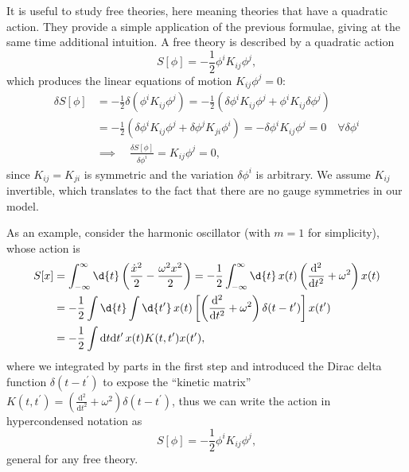 It is useful to study free theories, here meaning theories that have a quadratic action. They provide a simple application of the previous formulae, giving at the same time additional intuition. A free theory is described by a quadratic action
\[
    S[\phi] = - \frac{1}{2} \phi^i K_{ij} \phi^j,
\]
which produces the linear equations of motion \(K_{ij} \phi^j = 0\):
\[
    \begin{aligned}
        \delta S[\phi] & = - \frac{1}{2} \delta(\phi^i K_{ij} \phi^j) = - \frac{1}{2} \left( \delta \phi^i K_{ij} \phi^j + \phi^i K_{ij} \delta \phi^j \right)                    \\
                       & = - \frac{1}{2} \left( \delta \phi^i K_{ij} \phi^j + \delta \phi^j K_{ji} \phi^i \right) = - \delta \phi^i K_{ij} \phi^j = 0 \quad \forall \delta \phi^i \\
                       & \implies \quad \frac{\delta S[\phi]}{\delta \phi^i} = K_{ij} \phi^j = 0,
    \end{aligned}
\]
since \(K_{ij} = K_{ji}\) is symmetric and the variation \(\delta \phi^i\) is arbitrary. We assume \(K_{ij}\) invertible, which translates to the fact that there are no gauge symmetries in our model.

As an example, consider the harmonic oscillator (with \(m=1\) for simplicity), whose action is
\[
    \begin{aligned}
        S[x] & = \int_{-\infty}^{\infty}\d{t} \left(\frac{\dot{x}^2}{2} - \frac{\omega^2 x^2}{2}\right) = -\frac{1}{2} \int_{-\infty}^{\infty} \d{t} \, x(t) \left(\frac{\mathrm{d}^2}{\mathrm{d} t^2} + \omega^2 \right) x(t) \\
             & = -\frac{1}{2} \int \d{t} \int \d{t^{\prime}} \, x(t) \left[ \left(\frac{\mathrm{d}^2}{\mathrm{d} t^2} + \omega^2 \right) \delta(t - t^{\prime}) \right] x(t^{\prime})                                          \\
             & = -\frac{1}{2} \int \mathrm{d}t \mathrm{d}t^{\prime} \, x(t) K(t, t^{\prime}) x(t^{\prime}),
    \end{aligned}
\]
where we integrated by parts in the first step and introduced the Dirac delta function \(\delta(t-t^{\prime})\) to expose the “kinetic matrix” \(K(t,t^{\prime}) = \left(\frac{\mathrm{d}^2}{\mathrm{d} t^2} + \omega^2 \right) \delta(t - t^{\prime})\), thus we can write the action in hypercondensed notation as
\[
    S[\phi] = - \frac{1}{2} \phi^i K_{ij} \phi^j,
\]
general for any free theory.

